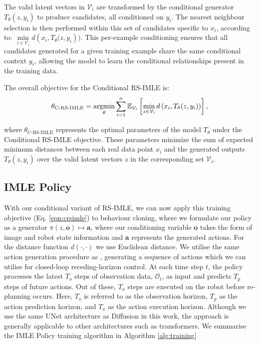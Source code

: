 The valid latent vectors in $\mathcal{V}_i$ are transformed by the conditional generator $T_\theta({z}, {y}_i)$ to produce candidates, all conditioned on $y_i$. The nearest neighbour selection is then performed within this set of candidates specific to ${x}_i$, according to:  $\operatorname{min}\limits_{{z} \in \mathcal{V}_i} d\left( {x}_i, T_\theta({z}, y_i\right)) $. This per-example conditioning ensures that all candidates generated for a given training example share the same conditional context $y_i$, allowing the model to learn the conditional relationships present in the training data.

The overall objective for the Conditional RS-IMLE is:
\begin{align}
\label{eqn:crsimle}
\theta_{\text{C-RS-IMLE}} = \operatorname*{argmin}_{\theta} \sum_{i=1}^n \mathbb{E}_{\mathcal{V}_i} \left[ \min_{{z} \in \mathcal{V}_i} d\left( {x}_i, T_\theta({z}, y_i)\right) \right],
\end{align}

\noindent where $\theta_{\text{C-RS-IMLE}}$ represents the optimal parameters of the model $T_\theta$ under the Conditional RS-IMLE objective. These parameters minimize the sum of expected minimum distances between each real data point ${x}_i$ and the generated outputs $T_\theta({z}, {y}_i)$ over the valid latent vectors ${z}$ in the corresponding set $\mathcal{V}_i$.

\subsection{IMLE Policy}
With our conditional variant of RS-IMLE, we can now apply this training objective (Eq. \ref{eqn:crsimle}) to behaviour cloning, where we formulate our policy as a generator $\pi(z,\mathbf{o}) \mapsto \mathbf{a}$, where our conditioning variable $\mathbf{o}$ takes the form of image and robot state information and $\mathbf{a}$ represents the generated actions. For the distance function $d(\cdot,\cdot)$ we use Euclidean distance. We utilise the same action generation procedure as \cite{chi2023diffusion}, generating a sequence of actions which we can utilise for closed-loop receding-horizon control. At each time step $t$, the policy processes the latest $T_o$ steps of observation data, $\mathcal{O}_t$, as input and predicts $T_p$ steps of future actions. Out of these, $T_a$ steps are executed on the robot before re-planning occurs. Here, $T_o$ is referred to as the observation horizon, $T_p$ as the action prediction horizon, and $T_a$ as the action execution horizon.
Although we use the same UNet architecture as Diffusion in this work, the approach is generally applicable to other architectures such as transformers. 
We summarise the IMLE Policy training algorithm in Algorithm \ref{alg:training}

